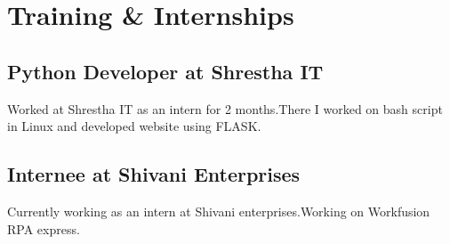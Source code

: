 \documentclass{article}
\begin{document}
	\section{Training \& Internships}
			\subsection{Python Developer at Shrestha IT}
			Worked at Shrestha IT as an intern for 2 months.There I worked on bash script in Linux and developed website using FLASK. 
			\subsection{Internee at Shivani Enterprises}
			Currently working as an intern at Shivani enterprises.Working on Workfusion RPA express.
			
\end{document}
